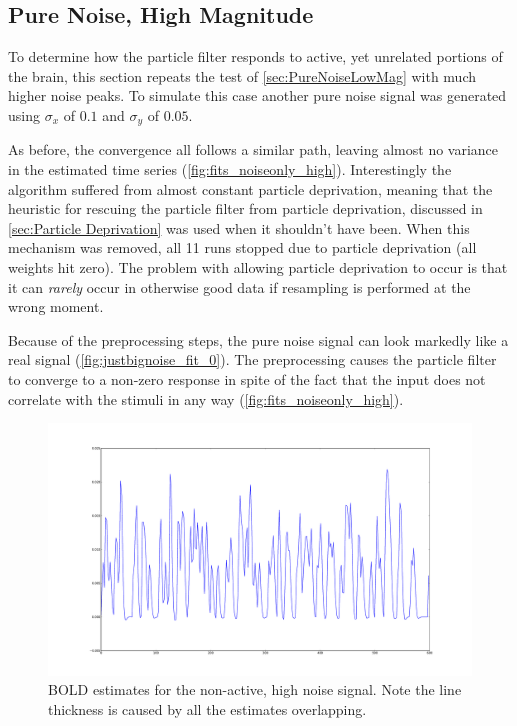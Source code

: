 \subsection{Pure Noise, High Magnitude}
\label{sec:PureNoiseHighMag}
To determine how the particle filter responds to active, yet unrelated
portions of the brain, this section repeats the test of \autoref{sec:PureNoiseLowMag}
with much higher noise peaks. To simulate this case another
pure noise signal was generated using $\sigma_x$ of $0.1$ and $\sigma_y$ of $0.05$.

As before, the convergence all follows a similar path, leaving almost no
variance in the estimated time series (\autoref{fig:fits_noiseonly_high}).
Interestingly the algorithm suffered from almost constant particle deprivation,
meaning that the heuristic
for rescuing the particle filter from particle deprivation, discussed in
\autoref{sec:Particle Deprivation} was used when it shouldn't have been.
 When this mechanism
was removed, all 11 runs stopped due to particle deprivation (all weights hit zero).
The problem with allowing particle deprivation to occur is that it can \emph{rarely}
occur in otherwise good data if resampling is performed at the wrong moment.

Because of the preprocessing steps, the pure noise signal can look markedly like a real
signal (\autoref{fig:justbignoise_fit_0}). The preprocessing causes the particle filter
to converge to a non-zero response in spite of the fact that the input does not correlate
with the stimuli in any way (\autoref{fig:fits_noiseonly_high}).

\begin{figure}[H]
\centering
\includegraphics[clip=true,trim=6cm 2cm 5cm 3cm,width=15cm]{images/fits_noiseonly_high}
\caption{BOLD estimates for the non-active, high noise signal. Note the line thickness is caused
by all the estimates overlapping.}
\label{fig:fits_noiseonly_high}
\end{figure}

